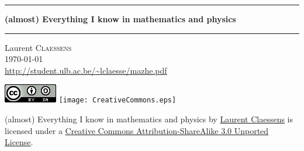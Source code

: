 \thispagestyle{empty}
\begin{center}
  \begin{minipage}{15cm}
    \hrule\par
    \vspace{2mm}
    \begin{center}
    \Huge \bfseries (almost) Everything I know in mathematics and physics\par
    \end{center}
    \hrule\par
  \end{minipage}
\end{center}

\vspace{2cm}

\begin{center}
    Laurent \textsc{Claessens}\\
    \today\\
    \url{http://student.ulb.ac.be/~lclaesse/mazhe.pdf}
\end{center}


\vfill

\begin{center}

        \ifpdf
            \includegraphics{CreativeCommons.png}
        \else
            \texttt{[image: CreativeCommons.eps]}
        \fi

        (almost) Everything I know in mathematics and physics by \href{http://student.ulb.ac.be/~lclaesse/research_page.html}{Laurent Claessens} is licensed under a \href{http://creativecommons.org/licenses/by-sa/3.0/}{Creative Commons Attribution-ShareAlike 3.0 Unported License}.
\end{center}










 




